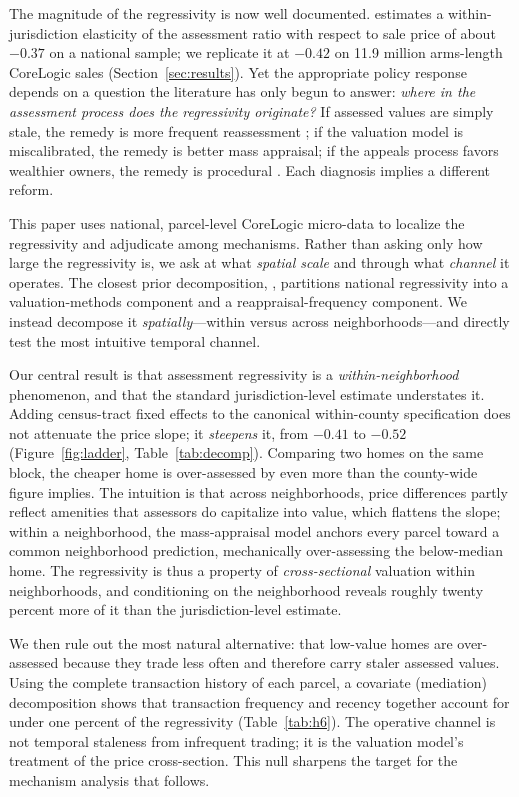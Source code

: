 \documentclass[12pt, letterpaper]{article}
\begin{document}
The magnitude of the regressivity is now well documented. \citet{berry2021reassessing} estimates a within-jurisdiction elasticity of the assessment ratio with respect to sale price of about $-0.37$ on a national sample; we replicate it at $-0.42$ on 11.9 million arms-length CoreLogic sales (Section~\ref{sec:results}). Yet the appropriate policy response depends on a question the literature has only begun to answer: \emph{where in the assessment process does the regressivity originate?} If assessed values are simply stale, the remedy is more frequent reassessment \citep{mikesell1980property, hou2023assessment}; if the valuation model is miscalibrated, the remedy is better mass appraisal; if the appeals process favors wealthier owners, the remedy is procedural \citep{mcmillen2013effect, doerner2014empirical}. Each diagnosis implies a different reform.

This paper uses national, parcel-level CoreLogic micro-data to localize the regressivity and adjudicate among mechanisms. Rather than asking only how large the regressivity is, we ask at what \emph{spatial scale} and through what \emph{channel} it operates. The closest prior decomposition, \citet{amornsiripanitch2022why}, partitions national regressivity into a valuation-methods component and a reappraisal-frequency component. We instead decompose it \emph{spatially}---within versus across neighborhoods---and directly test the most intuitive temporal channel.

Our central result is that assessment regressivity is a \emph{within-neighborhood} phenomenon, and that the standard jurisdiction-level estimate understates it. Adding census-tract fixed effects to the canonical within-county specification does not attenuate the price slope; it \emph{steepens} it, from $-0.41$ to $-0.52$ (Figure~\ref{fig:ladder}, Table~\ref{tab:decomp}). Comparing two homes on the same block, the cheaper home is over-assessed by even more than the county-wide figure implies. The intuition is that across neighborhoods, price differences partly reflect amenities that assessors do capitalize into value, which flattens the slope; within a neighborhood, the mass-appraisal model anchors every parcel toward a common neighborhood prediction, mechanically over-assessing the below-median home. The regressivity is thus a property of \emph{cross-sectional} valuation within neighborhoods, and conditioning on the neighborhood reveals roughly twenty percent more of it than the jurisdiction-level estimate.

We then rule out the most natural alternative: that low-value homes are over-assessed because they trade less often and therefore carry staler assessed values. Using the complete transaction history of each parcel, a covariate (mediation) decomposition shows that transaction frequency and recency together account for under one percent of the regressivity (Table~\ref{tab:h6}). The operative channel is not temporal staleness from infrequent trading; it is the valuation model's treatment of the price cross-section. This null sharpens the target for the mechanism analysis that follows.
\end{document}
